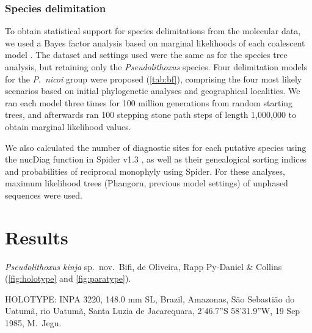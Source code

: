 \documentclass[12pt]{article}
\begin{document}
\subsubsection*{Species delimitation}

To obtain statistical support for species delimitations from the molecular data, we used a Bayes factor analysis based on marginal likelihoods of each coalescent model \citep{Fujita2012,Grummer2014}. %
The dataset and settings used were the same as for the species tree analysis, but retaining only the \emph{Pseudolithoxus} species. %
Four delimitation models for the \emph{P}.\ \emph{nicoi} group were proposed (\autoref{tab:bf}), comprising the four most likely scenarios based on initial phylogenetic analyses and geographical localities. %
We ran each model three times for 100 million generations from random starting trees, and afterwards ran 100 stepping stone \citep{Xie2011} path steps of length 1,000,000 to obtain marginal likelihood values.%

We also calculated the number of diagnostic sites for each putative species using the nucDiag function in Spider v1.3 \citep{Brown2012}, as well as their genealogical sorting indices \citep[genealogicalSorting v0.92;][]{Cummings2008} and probabilities of reciprocal monophyly \citep{Rosenberg2007} using Spider. %
For these analyses, maximum likelihood trees (Phangorn, previous model settings) of unphased sequences were used.%


\section*{Results}

\emph{Pseudolithoxus kinja} sp.\ nov.\ Bifi, de Oliveira, Rapp Py-Daniel \& Collins \\(\autoref{fig:holotype} and \autoref{fig:paratype}).\\
\bigskip

\noindent HOLOTYPE: INPA 3220, 148.0 mm SL, Brazil, Amazonas, São Sebastião do Uatumã, rio Uatumã, Santa Luzia de Jacarequara, 2’46.7”S 58’31.9”W, 19 Sep 1985, M.\ Jegu.\\%
\bigskip
\end{document}
